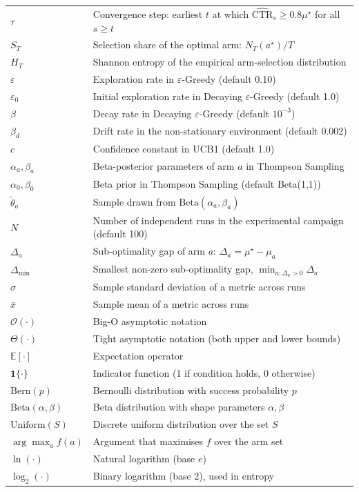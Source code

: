 \begin{xltabular}{\linewidth}{@{}p{3.0cm} X@{}}
$\tau$              & Convergence step: earliest $t$ at which $\widehat{\text{CTR}}_s \ge 0.8 \mu^\star$ for all $s \ge t$\\
$S_T$               & Selection share of the optimal arm: $N_T(a^\star)/T$\\
$H_T$               & Shannon entropy of the empirical arm-selection distribution\\
$\varepsilon$       & Exploration rate in $\varepsilon$-Greedy (default 0.10)\\
$\varepsilon_0$     & Initial exploration rate in Decaying $\varepsilon$-Greedy (default 1.0)\\
$\beta$             & Decay rate in Decaying $\varepsilon$-Greedy (default $10^{-3}$)\\
$\beta_d$           & Drift rate in the non-stationary environment (default 0.002)\\
$c$                 & Confidence constant in UCB1 (default 1.0)\\
$\alpha_a, \beta_a$ & Beta-posterior parameters of arm $a$ in Thompson Sampling\\
$\alpha_0, \beta_0$ & Beta prior in Thompson Sampling (default Beta(1,1))\\
$\tilde{\theta}_a$  & Sample drawn from $\mathrm{Beta}(\alpha_a, \beta_a)$\\
$N$                 & Number of independent runs in the experimental campaign (default 100)\\
$\Delta_a$          & Sub-optimality gap of arm $a$: $\Delta_a = \mu^\star - \mu_a$\\
$\Delta_{\min}$     & Smallest non-zero sub-optimality gap, $\min_{a:\Delta_a>0}\Delta_a$\\
$\sigma$            & Sample standard deviation of a metric across runs\\
$\bar{x}$           & Sample mean of a metric across runs\\
$\mathcal{O}(\cdot)$ & Big-O asymptotic notation\\
$\Theta(\cdot)$     & Tight asymptotic notation (both upper and lower bounds)\\
$\mathbb{E}[\cdot]$  & Expectation operator\\
$\mathbf{1}\{\cdot\}$ & Indicator function (1 if condition holds, 0 otherwise)\\
$\mathrm{Bern}(p)$  & Bernoulli distribution with success probability $p$\\
$\mathrm{Beta}(\alpha,\beta)$ & Beta distribution with shape parameters $\alpha,\beta$\\
$\mathrm{Uniform}(S)$ & Discrete uniform distribution over the set $S$\\
$\arg\max_a f(a)$   & Argument that maximises $f$ over the arm set\\
$\ln(\cdot)$        & Natural logarithm (base $e$)\\
$\log_2(\cdot)$     & Binary logarithm (base 2), used in entropy\\
\end{xltabular}
\newpage
